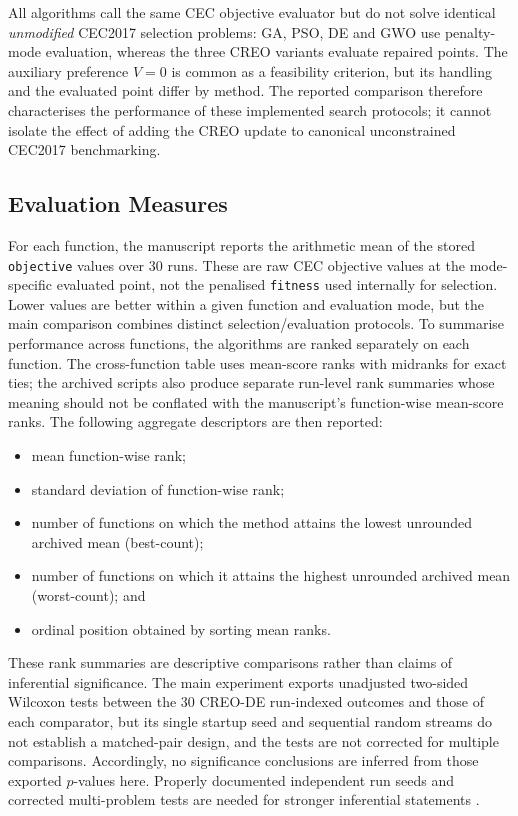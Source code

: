 \documentclass[journal]{IEEEtran}
\begin{document}
All algorithms call the same CEC objective evaluator but do not solve identical \emph{unmodified} CEC2017 selection problems: GA, PSO, DE and GWO use penalty-mode evaluation, whereas the three CREO variants evaluate repaired points. The auxiliary preference $V=0$ is common as a feasibility criterion, but its handling and the evaluated point differ by method. The reported comparison therefore characterises the performance of these implemented search protocols; it cannot isolate the effect of adding the CREO update to canonical unconstrained CEC2017 benchmarking.

\subsection{Evaluation Measures}

For each function, the manuscript reports the arithmetic mean of the stored \texttt{objective} values over 30 runs. These are raw CEC objective values at the mode-specific evaluated point, not the penalised \texttt{fitness} used internally for selection. Lower values are better within a given function and evaluation mode, but the main comparison combines distinct selection/evaluation protocols. To summarise performance across functions, the algorithms are ranked separately on each function. The cross-function table uses mean-score ranks with midranks for exact ties; the archived scripts also produce separate run-level rank summaries whose meaning should not be conflated with the manuscript's function-wise mean-score ranks. The following aggregate descriptors are then reported:
\begin{itemize}
    \item mean function-wise rank;
    \item standard deviation of function-wise rank;
    \item number of functions on which the method attains the lowest unrounded archived mean (best-count);
    \item number of functions on which it attains the highest unrounded archived mean (worst-count); and
    \item ordinal position obtained by sorting mean ranks.
\end{itemize}

These rank summaries are descriptive comparisons rather than claims of inferential significance. The main experiment exports unadjusted two-sided Wilcoxon tests between the 30 CREO-DE run-indexed outcomes and those of each comparator, but its single startup seed and sequential random streams do not establish a matched-pair design, and the tests are not corrected for multiple comparisons. Accordingly, no significance conclusions are inferred from those exported $p$-values here. Properly documented independent run seeds and corrected multi-problem tests are needed for stronger inferential statements \cite{garcia2009nonparametric,derrac2011tutorial}.
\end{document}
